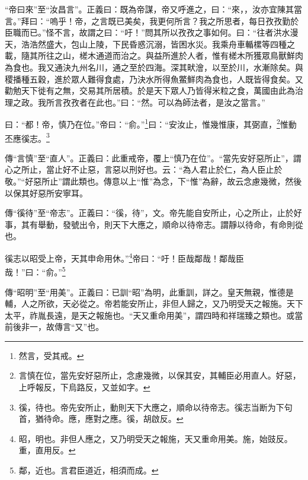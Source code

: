 {\noindent\shu{}\fzkt “帝曰來”至“汝昌言”。正義曰：既為帝謀，帝又呼進之，曰：“來，，汝亦宜陳其當言。”拜曰：“嗚乎！帝，之言既已美矣，我更何所言？我之所思者，每日孜孜勤於臣職而已。”怪不言，故謂之曰：“吁！”問其所以孜孜之事如何。曰：“往者洪水漫天，浩浩然盛大，包山上陵，下民昏惑沉溺，皆困水災。我乘舟車輴樏等四種之載，隨其所往之山，槎木通道而治之。與益所進於人者，惟有槎木所獲眾鳥獸鮮肉為食也。我又通決九州名川，通之至於四海。深其畎澮，以至於川，水漸除矣。與稷播種五穀，進於眾人難得食處，乃決水所得魚鱉鮮肉為食也，人既皆得食矣。又勸勉天下徙有之無，交易其所居積。於是天下眾人乃皆得米粒之食，萬國由此為治理之政。我所言孜孜者在此也。”曰：“然。可以為師法者，是汝之當言。” \par}

曰：“都！帝，慎乃在位。”帝曰：“俞。”\footnote{然言，受其戒。}曰：“安汝止，惟幾惟康，其弼直，\footnote{言慎在位，當先安好惡所止，念慮幾微，以保其安，其輔臣必用直人。好惡，上呼報反，下烏路反，又並如字。}惟動丕應徯志。\footnote{徯，待也。帝先安所止，動則天下大應之，順命以待帝志。徯志当断为下句首，猶待命。應，應對之應。徯，胡啟反。}


{\noindent\zhuan{}\fzbyks 傳“言慎”至“直人”。正義曰：此重戒帝，覆上“慎乃在位”。“當先安好惡所止”，謂心之所止，當止好不止惡，言惡以刑好也。云：“為人君止於仁，為人臣止於敬。”“好惡所止”謂此類也。傳意以上“惟”為念，下“惟”為辭，故云念慮幾微，然後以保其好惡所安寧耳。 \par}

{\noindent\zhuan{}\fzbyks 傳“徯待”至“帝志”。正義曰：“徯，待”，文。帝先能自安所止，心之所止，止於好事，其有舉動，發號出令，則天下大應之，順命以待帝志。謂靜以待命，有命則從也。 \par}

徯志以昭受上帝，天其申命用休。”\footnote{昭，明也。非但人應之，又乃明受天之報施，天又重命用美。施，始豉反。重，直用反。}帝曰：“吁！臣哉鄰哉！鄰哉臣哉！”曰：“俞。”\footnote{鄰，近也。言君臣道近，相須而成。}

{\noindent\zhuan{}\fzbyks 傳“昭明”至“用美”。正義曰：已訓“昭”為明，此重訓，詳之。皇天無親，惟德是輔，人之所欲，天必從之。帝若能安所止，非但人歸之，又乃明受天之報施。天下太平，祚胤長遠，是天之報施也。“天又重命用美”，謂四時和祥瑞臻之類也。或當前後非一，故傳言“又”也。 \par}

